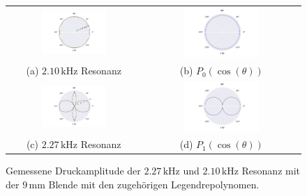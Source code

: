 \begin{figure}[H]
  \centering
  \begin{tabular}{cc}
    \includegraphics[width=0.5\textwidth]{Daten/Wasserstoff/neu/peak9mm1.pdf} &   \includegraphics[width=0.5\textwidth]{Daten/Wasserstoffmolekuelion/peakLeg.pdf} \\
  (a) $2.10 \,\si{\kilo\hertz}$ Resonanz & (b) $P_0(\cos(\theta))$ \\[6pt]
  \includegraphics[width=0.5\textwidth]{Daten/Wasserstoff/neu/peak9mm.pdf} &   \includegraphics[width=0.5\textwidth]{Daten/Wasserstoff/peakLeg0.pdf} \\
  (c) $2.27 \,\si{\kilo\hertz}$ Resonanz & (d) $P_1(\cos(\theta))$ \\[6pt]
  \end{tabular}
  \caption{Gemessene Druckamplitude der $2.27 \,\si{\kilo\hertz}$ und $2.10 \,\si{\kilo\hertz}$ Resonanz mit der $9 \,\si{\milli\metre}$ Blende mit den zugehörigen Legendrepolynomen.} 
  \label{fig:9mm}
\end{figure}

